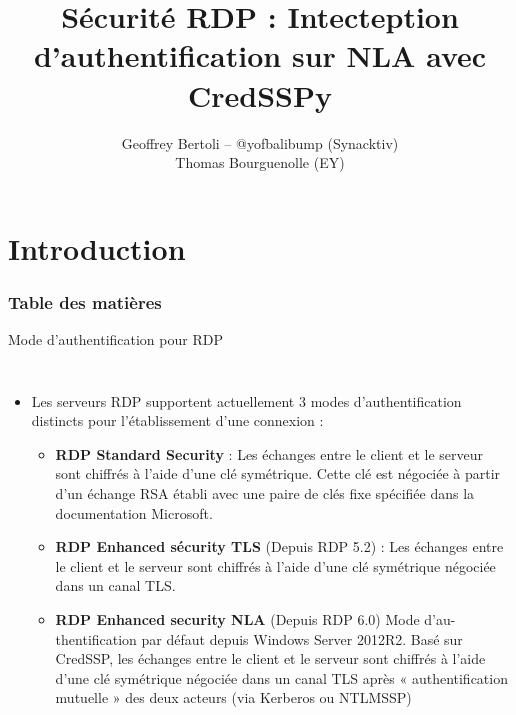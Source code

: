 \documentclass{beamer}
\title{\textbf{Sécurité RDP : Intecteption d'authentification sur NLA avec CredSSPy}}
\author{Geoffrey Bertoli -- @yofbalibump (Synacktiv)\\
		Thomas Bourguenolle (EY)
		}
\date{}
\begin{document}
	
\begin{frame}
\titlepage
\end{frame}

\section{Introduction}

\begin{frame}
\frametitle{Table des matières}
\tableofcontents[currentsection]
\end{frame}



\begin{frame}{Mode d'authentification pour RDP}
	\begin{columns}
	\column {\textwidth}
		\begin{itemize}
		\item Les serveurs RDP supportent actuellement 3 modes d’authentification
		distincts pour l’établissement d’une connexion :
		\begin{itemize}
		\item \textbf{RDP Standard Security} :  Les échanges entre le client et le
		serveur sont chiffrés à l’aide d’une clé symétrique. Cette clé est
		négociée à partir d’un échange RSA établi avec une paire de clés
		fixe spécifiée dans la documentation Microsoft.
		\item \textbf{RDP Enhanced sécurity TLS} (Depuis RDP 5.2) :  Les échanges
		entre le client et le serveur sont chiffrés à l’aide d’une clé symétrique
		négociée dans un canal TLS.
		\item \textbf{RDP Enhanced security NLA} (Depuis RDP 6.0) Mode d’au-
		thentification par défaut depuis Windows Server 2012R2. Basé sur CredSSP, les échanges entre
		le client et le serveur sont chiffrés à l'aide d’une clé symétrique
		négociée dans un canal TLS après « authentification mutuelle » des
		deux acteurs (via Kerberos ou NTLMSSP)
		\end{itemize}
		\end{itemize}
	\end{columns}
   \end{frame}
\end{document}

